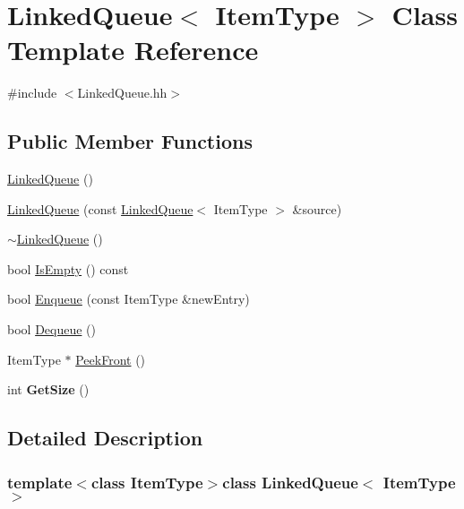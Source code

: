 \hypertarget{class_linked_queue}{\section{Linked\-Queue$<$ Item\-Type $>$ Class Template Reference}
\label{class_linked_queue}
}


{\ttfamily \#include $<$Linked\-Queue.\-hh$>$}

\subsection*{Public Member Functions}
\begin{DoxyCompactItemize}
\item 
\hyperlink{class_linked_queue_a5d98abc89b1b3cbb758ec4cb45e9248a}{Linked\-Queue} ()
\item 
\hyperlink{class_linked_queue_a29b5660d68aed2eb09d74877602e7ff1}{Linked\-Queue} (const \hyperlink{class_linked_queue}{Linked\-Queue}$<$ Item\-Type $>$ \&source)
\item 
\hyperlink{class_linked_queue_a2a88d36f0ddf6550a6e67bb1afc9a439}{$\sim$\-Linked\-Queue} ()
\item 
bool \hyperlink{class_linked_queue_a8a9f1695afe195c794fa070452b5793a}{Is\-Empty} () const 
\item 
bool \hyperlink{class_linked_queue_a143277a1f1cced81d9eeb829d7028440}{Enqueue} (const Item\-Type \&new\-Entry)
\item 
bool \hyperlink{class_linked_queue_a1db105697494ef453f24f5bb5365232e}{Dequeue} ()
\item 
Item\-Type $\ast$ \hyperlink{class_linked_queue_adec4e9cd2e4e8e31c072fecb7ed76334}{Peek\-Front} ()
\item 
\hypertarget{class_linked_queue_ae2c4221b897ca9a43585c4f13e3ea179}{int {\bfseries Get\-Size} ()}\label{class_linked_queue_ae2c4221b897ca9a43585c4f13e3ea179}

\end{DoxyCompactItemize}


\subsection{Detailed Description}
\subsubsection*{template$<$class Item\-Type$>$class Linked\-Queue$<$ Item\-Type $>$}

